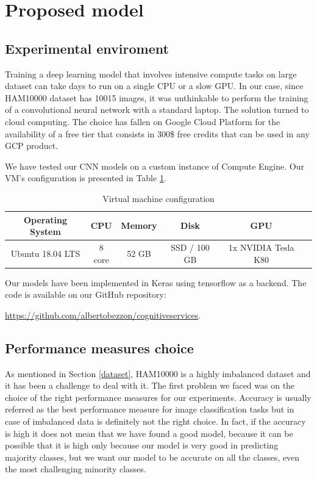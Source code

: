 \section{Proposed model} \label{proposed_model}

	\subsection{Experimental enviroment}
	
	Training a deep learning model that involves intensive compute tasks on large dataset can take days to run on a single CPU or a slow GPU. In our case, since HAM10000 dataset has 10015 images, it was unthinkable to perform the training of a convolutional neural network with a standard laptop. The solution turned to cloud computing. The choice has fallen on Google Cloud Platform for the availability of a free tier that consists in 300\$ free credits that can be used in any GCP product. 
	
	\smallskip
	
	We have tested our CNN models on a custom instance of Compute Engine. Our VM's configuration is presented in Table \ref{tab:hw-config}.
	
	\begin{table}[H]
		\centering
		\begin{tabular}{ |c|c|c|c|c|c| }
			\hline
			\textbf{Operating System} & \textbf{CPU} & \textbf{Memory} & \textbf{Disk} & \textbf{GPU} \\ \hline
			
			Ubuntu 18.04 LTS & 8 core & 52 GB & SSD / 100 GB & 1x NVIDIA Tesla K80 \\ \hline
			
		\end{tabular}
		\caption{Virtual machine configuration}
		\label{tab:hw-config}
	\end{table}
	
	Our models have been implemented in Keras using tensorflow as a backend. The code is available on our GitHub repository:
	\begin{sloppypar}
 	\url{https://github.com/albertobezzon/cognitiveservices}.
	\end{sloppypar}

	\subsection{Performance measures choice}
		
		As mentioned in Section \ref{dataset}, HAM10000 is a highly imbalanced dataset and it has been a challenge to deal with it. The first problem we faced was on the choice of the right performance measures for our experiments. Accuracy is usually referred as the best performance measure for image classification tasks but in case of imbalanced data is definitely not the right choice. In fact, if the accuracy is high it does not mean that we have found a good model, because it can be possible that it is high only because our model is very good in predicting majority classes, but we want our model to be accurate on all the classes, even the most challenging minority classes.
		
